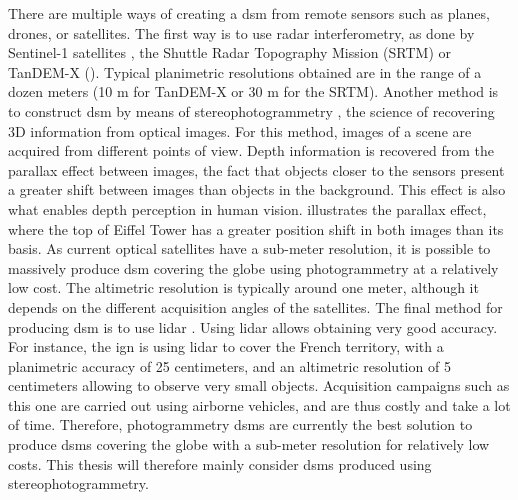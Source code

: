 There are multiple ways of creating a \acrshort{dsm} from remote sensors such as planes, drones, or satellites. The first way is to use \acrshort{radar} interferometry, as done by Sentinel-1 satellites \cite{geudtner_sentinel-1_2014}, the Shuttle Radar Topography Mission (SRTM) \cite{farr_shuttle_2007} or TanDEM-X (\cite{krieger_tandem-x_2007}). Typical planimetric resolutions obtained are in the range of a dozen meters (10 m for TanDEM-X or 30 m for the SRTM). Another method is to construct \acrshort{dsm} by means of stereophotogrammetry \cite{tao_comprehensive_2001}, \ie the science of recovering 3D information from optical images. For this method, images of a scene are acquired from different points of view. Depth information is recovered from the parallax effect between images, \ie the fact that objects closer to the sensors present a greater shift between images than objects in the background. This effect is also what enables depth perception in human vision.  illustrates the parallax effect, where the top of Eiffel Tower has a greater position shift in both images than its basis. As current optical satellites have a sub-meter resolution, it is possible to massively produce \acrshort{dsm} covering the globe using photogrammetry at a relatively low cost. The altimetric resolution is typically around one meter, although it depends on the different acquisition angles of the satellites. The final method for producing \acrshort{dsm} is to use \acrfull{lidar} \cite{khosravipour_generating_2016}. Using \acrshort{lidar} allows obtaining very good accuracy. For instance, the \acrfull{ign} is using \acrshort{lidar} to cover the French territory, with a planimetric accuracy of 25 centimeters, and an altimetric resolution of 5 centimeters allowing to observe very small objects. Acquisition campaigns such as this one are carried out using airborne vehicles, and are thus costly and take a lot of time. Therefore, photogrammetry \acrshort{dsm}s are currently the best solution to produce \acrshort{dsm}s covering the globe  with a sub-meter resolution for relatively low costs. This thesis will therefore mainly consider \acrshort{dsm}s produced using stereophotogrammetry.

